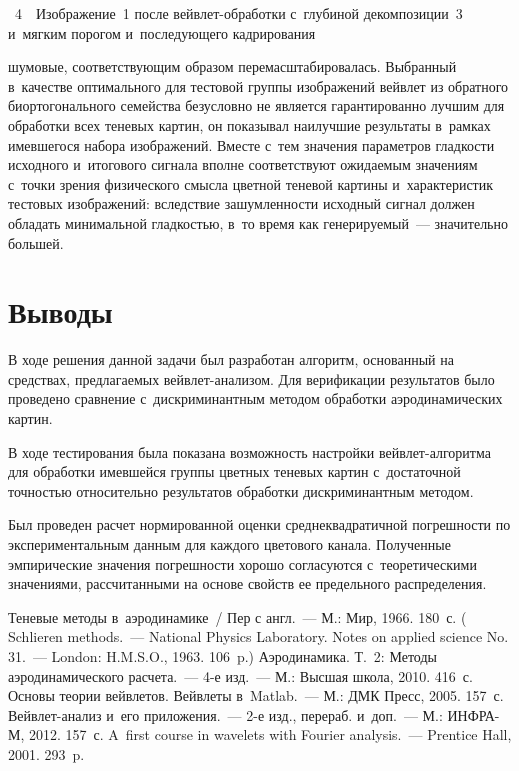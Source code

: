 \begin{multicols}{2}
\noindent
{{\figurename~4}\ \ \small{Изображение~1 после вейв\-лет-об\-ра\-бот\-ки 
с~глубиной декомпозиции~3 и~мягким порогом и~последующего кадрирования}}



 \vspace*{24pt}
 
 \addtocounter{figure}{1}
 
 \noindent
  шумовые, 
соответствующим образом перемасштабировалась. Выбранный в~качестве 
оптимального для тестовой группы изображений вейвлет из обратного 
биортогонального семейства безусловно не является гарантированно 
лучшим для обработки всех теневых картин, он показывал наилучшие 
результаты в~рамках имевшегося набора изображений. Вмес\-те с~тем 
значения параметров гладкости исходного и~итогового сигнала 
вполне соответствуют ожи\-да\-емым значениям с~точки зрения физического 
смыс\-ла цветной теневой картины и~характеристик тестовых изображений: 
вследствие зашумленности исходный сигнал должен обладать минимальной 
гладкостью, в~то время как генерируемый~--- значительно большей.

\section{Выводы}
В ходе решения данной задачи был разработан алгоритм, 
основанный на средствах, предлагаемых вейв\-лет-ана\-ли\-зом. 
Для верификации результатов было проведено сравнение с~дискриминантным 
методом обработки аэродинамических картин.

В ходе тестирования была показана возможность настройки вейв\-лет-ал\-го\-рит\-ма 
для обработки имевшейся группы цветных теневых картин с~достаточной точностью 
относительно результатов обработки дискриминантным методом.

Был проведен расчет нормированной оценки среднеквадратичной погрешности 
по экспериментальным данным для каждого цветового канала. Полученные 
эмпирические значения погрешности хорошо согласуются с~теоретическими 
значениями, рассчитанными на основе свойств ее предельного распределения.

{\small\frenchspacing
 {%
 \begin{thebibliography}{99}
     Теневые методы в~аэродинамике~/
    Пер с англ.~--- М.: Мир, 1966.
    180~с. ( Schlieren methods.~---
    National Physics Laboratory. Notes on applied science No.\,31.~---
    London: H.M.S.O., 1963. 106~p.)
     Аэродинамика. Т.~2: Методы аэродинамического расчета.~---
     4-е изд.~--- М.: Высшая школа, 2010. 416~с.
    Основы теории вейв\-ле\-тов. Вейвлеты в~Matlab.~--- М.: ДМК Пресс, 2005. 157~с.
    Вей\-в\-лет-ана\-лиз и~его приложения.~--- 2-е изд., перераб. и~доп.~--- 
    М.: ИНФРА-М, 2012. 157~с.
    A~first course in wavelets with Fourier analysis.~--- Prentice Hall, 2001. 293~p.


\end{thebibliography}}}
\end{multicols}
